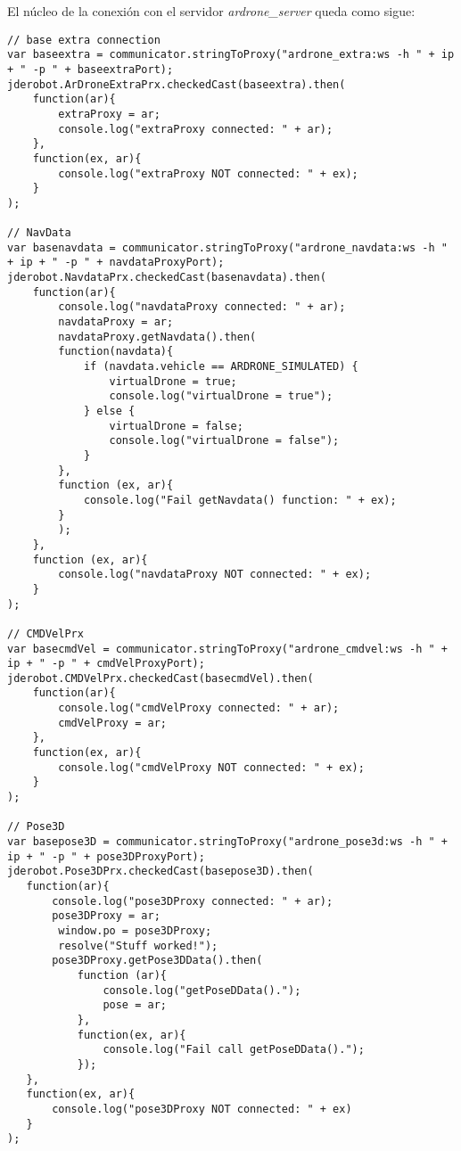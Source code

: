 El núcleo de la conexión con el servidor \emph{ardrone\_server} queda como sigue:\\
\newpage
\begin{lstlisting}[caption=Núcleo ArDrone]
// base extra connection
var baseextra = communicator.stringToProxy("ardrone_extra:ws -h " + ip + " -p " + baseextraPort);
jderobot.ArDroneExtraPrx.checkedCast(baseextra).then(
    function(ar){
        extraProxy = ar;
        console.log("extraProxy connected: " + ar);
    },
    function(ex, ar){
        console.log("extraProxy NOT connected: " + ex);
    }
);               

// NavData
var basenavdata = communicator.stringToProxy("ardrone_navdata:ws -h " + ip + " -p " + navdataProxyPort);
jderobot.NavdataPrx.checkedCast(basenavdata).then(
    function(ar){
        console.log("navdataProxy connected: " + ar);
        navdataProxy = ar;
        navdataProxy.getNavdata().then(
        function(navdata){
            if (navdata.vehicle == ARDRONE_SIMULATED) {
                virtualDrone = true;
                console.log("virtualDrone = true");
            } else {
                virtualDrone = false;
                console.log("virtualDrone = false");
            }
        },
        function (ex, ar){
            console.log("Fail getNavdata() function: " + ex);
        }
        );
    },
    function (ex, ar){
        console.log("navdataProxy NOT connected: " + ex);
    }        
);        

// CMDVelPrx
var basecmdVel = communicator.stringToProxy("ardrone_cmdvel:ws -h " + ip + " -p " + cmdVelProxyPort);
jderobot.CMDVelPrx.checkedCast(basecmdVel).then(
    function(ar){
        console.log("cmdVelProxy connected: " + ar);
        cmdVelProxy = ar;
    },
    function(ex, ar){
        console.log("cmdVelProxy NOT connected: " + ex);
    }
);             

// Pose3D
var basepose3D = communicator.stringToProxy("ardrone_pose3d:ws -h " + ip + " -p " + pose3DProxyPort);
jderobot.Pose3DPrx.checkedCast(basepose3D).then(
   function(ar){
       console.log("pose3DProxy connected: " + ar);
       pose3DProxy = ar;
        window.po = pose3DProxy;
        resolve("Stuff worked!");
       pose3DProxy.getPose3DData().then(
           function (ar){
               console.log("getPoseDData().");
               pose = ar;
           },
           function(ex, ar){
               console.log("Fail call getPoseDData().");
           });
   },
   function(ex, ar){
       console.log("pose3DProxy NOT connected: " + ex)
   }
);
\end{lstlisting}

